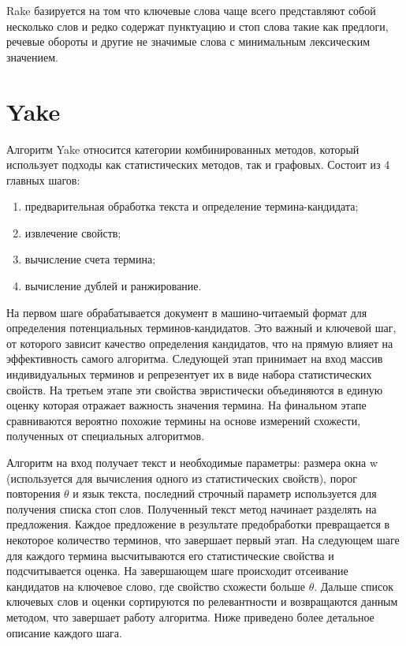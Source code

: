 Rake базируется на том что ключевые слова чаще всего представляют собой несколько слов и редко содержат пунктуацию и стоп слова такие как предлоги, речевые обороты и другие не значимые слова с минимальным лексическим значением. \cite{15}

\section{Yake}

Алгоритм Yake относится категории комбинированных методов, который использует подходы как статистических методов, так и графовых. 
Состоит из 4 главных шагов:

\begin{enumerate}
	\item предварительная обработка текста и определение термина-кандидата;
	\item извлечение свойств;
	\item вычисление счета термина;
	\item вычисление дублей и ранжирование.
\end{enumerate}
На первом шаге обрабатывается документ в машино-читаемый формат для определения потенциальных терминов-кандидатов.
Это важный и ключевой шаг, от которого зависит качество определения кандидатов, что на прямую влияет на эффективность самого алгоритма.
Следующей этап принимает на вход массив индивидуальных терминов и репрезентует их в виде набора статистических свойств.
На третьем этапе эти свойства эвристически объединяются в единую оценку которая отражает важность значения термина.
На финальном этапе сравниваются вероятно похожие термины на основе измерений схожести, полученных от специальных алгоритмов.

Алгоритм на вход получает текст и необходимые параметры: размера окна w (используется для вычисления одного из статистических свойств), порог повторения $\theta$ и язык текста, последний строчный параметр используется для получения списка стоп слов.
Полученный текст метод начинает разделять на предложения.
Каждое предложение в результате предобработки превращается в некоторое количество терминов, что завершает первый этап.
На следующем шаге для каждого термина высчитываются его статистические свойства и подсчитывается оценка.
На завершающем шаге происходит отсеивание кандидатов на ключевое слово, где свойство схожести больше $\theta$.
Дальше список ключевых слов и оценки сортируются по релевантности и возвращаются данным методом, что завершает работу алгоритма.
Ниже приведено более детальное описание каждого шага.

